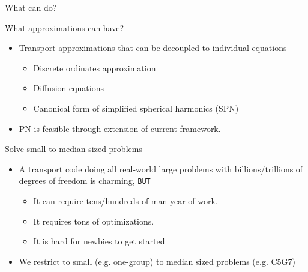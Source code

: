 \begin{frame}{What can  do?}
	\begin{block}{What approximations can  have?}
		\begin{itemize}
			\item Transport approximations that can be decoupled to individual equations
			\begin{itemize}
				\item Discrete ordinates approximation
				\item Diffusion equations
				\item Canonical form of simplified spherical harmonics (SPN)
			\end{itemize}
			\item PN is feasible through extension of current framework.
		\end{itemize}
	\end{block}
	\begin{block}{Solve small-to-median-sized problems}
		\begin{itemize}
			\item A transport code doing all real-world large problems with billions/trillions of degrees of freedom is charming, {\tt BUT}
			\begin{itemize}
				\item It can require tens/hundreds of man-year of work.
				\item It requires tons of optimizations.
				\item It is hard for newbies to get started
			\end{itemize}
			\item We restrict  to small (e.g. one-group) to median sized problems (e.g. C5G7)
		\end{itemize}
	\end{block}
\end{frame}